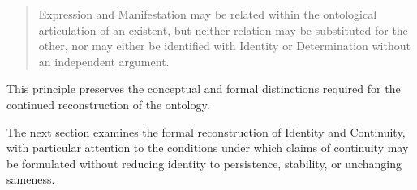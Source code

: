 \begin{quote}
Expression and Manifestation
may be related within
the ontological articulation
of an existent, but
neither relation may
be substituted for
the other, nor may
either be identified
with Identity or
Determination without
an independent argument.
\end{quote}

This principle preserves
the conceptual and
formal distinctions
required for the
continued reconstruction
of the ontology.

The next section
examines the formal
reconstruction of
Identity and Continuity,
with particular attention
to the conditions
under which claims
of continuity may
be formulated without
reducing identity
to persistence,
stability, or
unchanging sameness.

